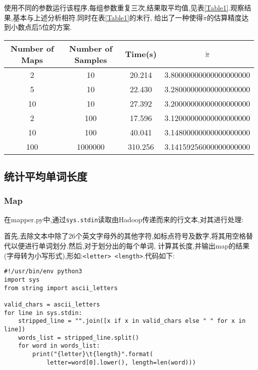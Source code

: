 \documentclass[a4paper]{article}
\begin{document}
使用不同的参数运行该程序,每组参数重复三次,结果取平均值,见表\ref{Table1}.观察结果,基本与上述分析相符.同时在表\ref{Table1}的末行,
给出了一种使得$\acute{\pi}$的估算精度达到小数点后5位的方案.
\begin{table*}
\centering
\caption{使用Hadoop计算圆周率}
\begin{tabular}{cccc} 
\toprule
Number of Maps & Number of Samples & Time(s) & $\acute{\pi}$\\
\midrule 
2 & 10 & 20.214 & 3.80000000000000000000\\
5 & 10 & 22.430 & 3.28000000000000000000\\
10 & 10 & 27.392 & 3.20000000000000000000\\
2 & 100 & 17.596 & 3.12000000000000000000\\
10 & 100 & 40.041 & 3.14800000000000000000\\
100 & 1000000 & 310.256 & 3.14159256000000000000\\
\bottomrule 
\end{tabular}
\label{Table1}
\end{table*}
    \subsection{统计平均单词长度}
        \subsubsection{Map}
在mapper.py中,通过\texttt{sys.stdin}读取由Hadoop传递而来的行文本,对其进行处理:

首先,去除文本中除了26个英文字母外的其他字符,如标点符号及数字,将其用空格替代以便进行单词划分.然后,对于划分出的每个单词,
计算其长度,并输出map的结果(字母转为小写形式),形如:\texttt{<letter> <length>}.代码如下:
\begin{verbatim}
#!/usr/bin/env python3
import sys
from string import ascii_letters

valid_chars = ascii_letters
for line in sys.stdin:
    stripped_line = "".join([x if x in valid_chars else " " for x in line])
    words_list = stripped_line.split()
    for word in words_list:
        print("{letter}\t{length}".format(
            letter=word[0].lower(), length=len(word)))
\end{verbatim}
\end{document}
